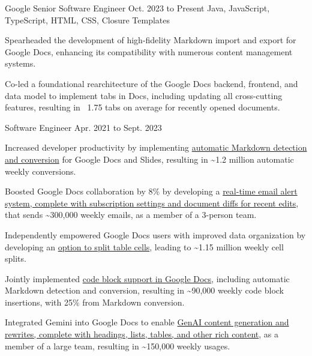 
\begin{cventry}
    {Google}
    {Senior Software Engineer}
    {Oct. 2023 to Present}
    {Java, JavaScript, TypeScript, HTML, CSS, Closure Templates}
    \begin{cvitems}
        \item Spearheaded the development of high-fidelity Markdown import and export for Google Docs, enhancing its compatibility with numerous content management systems.
        \item Co-led a foundational rearchitecture of the Google Docs backend, frontend, and data model to implement tabs in Docs, including updating all cross-cutting features, resulting in ~1.75 tabs on average for recently opened documents.
    \end{cvitems}
\end{cventry}

\begin{cventry}
    {}
    {Software Engineer}
    {Apr. 2021 to Sept. 2023}{}
    \begin{cvitems}
        \item Increased developer productivity by implementing \href{https://workspaceupdates.googleblog.com/2022/03/compose-with-markdown-in-google-docs-on.html}{automatic Markdown detection and conversion} for Google Docs and Slides, resulting in \~{}1.2 million automatic weekly conversions.
        \item Boosted Google Docs collaboration by 8\% by developing a \href{https://workspaceupdates.googleblog.com/2022/07/edit-notifications-for-document-content-changes.html}{real-time email alert system, complete with subscription settings and document diffs for recent edits}, that sends \~{}300,000 weekly emails, as a member of a 3-person team.
        \item Independently empowered Google Docs users with improved data organization by developing an \href{https://workspaceupdates.googleblog.com/2022/10/split-table-cells-in-google-docs.html}{option to split table cells}, leading to \~{}1.15 million weekly cell splits.
        \item Jointly implemented \href{https://workspaceupdates.googleblog.com/2022/12/format-display-code-google-docs.html}{code block support in Google Docs}, including automatic Markdown detection and conversion, resulting in \~{}90,000 weekly code block insertions, with 25\% from Markdown conversion.
        \item Integrated Gemini into Google Docs to enable \href{https://workspace.google.com/blog/product-announcements/generative-ai}{GenAI content generation and rewrites, complete with headings, lists, tables, and other rich content}, as a member of a large team, resulting in \~{}150,000 weekly usages.
    \end{cvitems}
\end{cventry}

